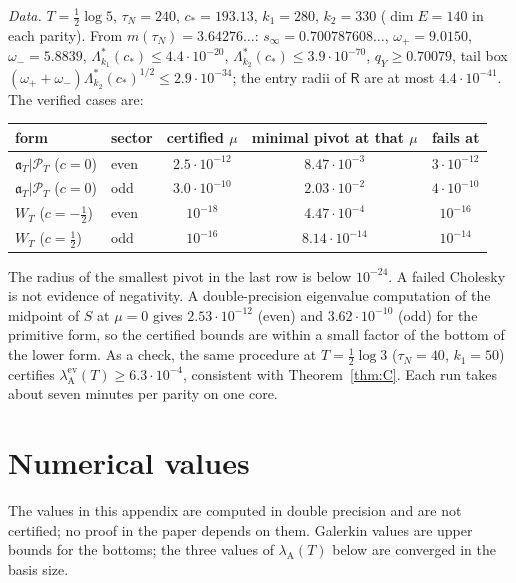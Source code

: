 \documentclass[11pt]{amsart}
\theoremstyle{definition}
\theoremstyle{remark}
\newcommand{\PT}{\mathcal P_T}
\newcommand{\lamA}{\lambda_{\mathrm A}(T)}
\begin{document}
\emph{Data.} $T=\frac12\log5$, $\tau_N=240$, $c_*=193.13$, $k_1=280$, $k_2=330$ ($\dim E=140$ in each parity).
From $m(\tau_N)=3.64276\ldots$: $s_\infty=0.700787608\ldots$, $\omega_+=9.0150$, $\omega_-=5.8839$,
$\Lambda^*_{k_1}(c_*)\le4.4\cdot10^{-20}$, $\Lambda^*_{k_2}(c_*)\le3.9\cdot10^{-70}$, $q_Y\ge0.70079$, tail
box $(\omega_++\omega_-)\Lambda^*_{k_2}(c_*)^{1/2}\le2.9\cdot10^{-34}$; the entry radii of $\mathsf R$ are at
most $4.4\cdot10^{-41}$. The verified cases are:
\begin{center}\small
\begin{tabular}{@{}llccc@{}}
\toprule
form & sector & certified $\mu$ & minimal pivot at that $\mu$ & fails at\\
\midrule
$\mathfrak a_T|\PT$ ($c=0$) & even & $2.5\cdot10^{-12}$ & $8.47\cdot10^{-3}$ & $3\cdot10^{-12}$\\
$\mathfrak a_T|\PT$ ($c=0$) & odd & $3.0\cdot10^{-10}$ & $2.03\cdot10^{-2}$ & $4\cdot10^{-10}$\\
$W_T$ ($c=-\frac12$) & even & $10^{-18}$ & $4.47\cdot10^{-4}$ & $10^{-16}$\\
$W_T$ ($c=\frac12$) & odd & $10^{-16}$ & $8.14\cdot10^{-14}$ & $10^{-14}$\\
\bottomrule
\end{tabular}
\end{center}
The radius of the smallest pivot in the last row is below $10^{-24}$. A failed Cholesky is not evidence of
negativity. A double-precision eigenvalue computation of the midpoint of $S$ at $\mu=0$ gives
$2.53\cdot10^{-12}$ (even) and $3.62\cdot10^{-10}$ (odd) for the primitive form, so the certified bounds are
within a small factor of the bottom of the lower form. As a check, the same procedure at
$T=\frac12\log3$ ($\tau_N=40$, $k_1=50$) certifies $\lambda^{\mathrm{ev}}_{\mathrm A}(T)\ge6.3\cdot10^{-4}$,
consistent with Theorem~\ref{thm:C}. Each run takes about seven minutes per parity on one core.


\section{Numerical values}\label{app:num}

The values in this appendix are computed in double precision and are not certified; no proof in the paper
depends on them. Galerkin values are upper bounds for the bottoms; the three values of $\lamA$ below are
converged in the basis size.
\end{document}
